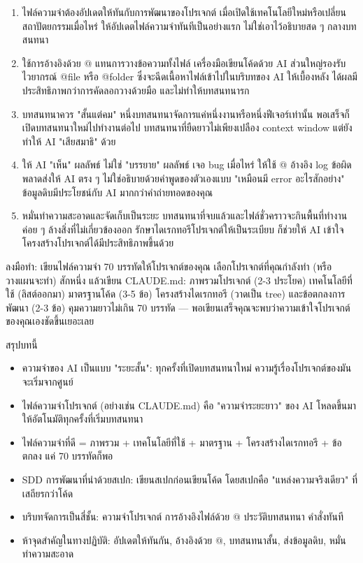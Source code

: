 \begin{enumerate}
  \item ไฟล์ความจำต้องอัปเดตให้ทันกับการพัฒนาของโปรเจกต์ เมื่อเปิดใช้เทคโนโลยีใหม่หรือเปลี่ยนสถาปัตยกรรมเมื่อไหร่ ให้อัปเดตไฟล์ความจำทันทีเป็นอย่างแรก ไม่ใช่เอาไว้อธิบายสด ๆ กลางบทสนทนา
  \item ใช้การอ้างอิงด้วย @ แทนการวางข้อความทั้งไฟล์ เครื่องมือเขียนโค้ดด้วย AI ส่วนใหญ่รองรับไวยากรณ์ @file หรือ @folder ซึ่งจะฉีดเนื้อหาไฟล์เข้าไปในบริบทของ AI ให้เบื้องหลัง ได้ผลมีประสิทธิภาพกว่าการคัดลอกวางด้วยมือ และไม่ทำให้บทสนทนารก
  \item บทสนทนาควร "สั้นแต่คม" หนึ่งบทสนทนาจัดการแค่หนึ่งงานหรือหนึ่งฟีเจอร์เท่านั้น พอเสร็จก็เปิดบทสนทนาใหม่ไปทำงานต่อไป บทสนทนาที่ยืดยาวไม่เพียงเปลือง context window แต่ยังทำให้ AI "เสียสมาธิ" ด้วย
  \item ให้ AI "เห็น" ผลลัพธ์ ไม่ใช่ "บรรยาย" ผลลัพธ์ เจอ bug เมื่อไหร่ ให้ใช้ @ อ้างอิง log ข้อผิดพลาดส่งให้ AI ตรง ๆ ไม่ใช่อธิบายด้วยคำพูดของตัวเองแบบ "เหมือนมี error อะไรสักอย่าง" ข้อมูลดิบมีประโยชน์กับ AI มากกว่าคำถ่ายทอดของคุณ
  \item หมั่นทำความสะอาดและจัดเก็บเป็นระยะ บทสนทนาที่จบแล้วและไฟล์ชั่วคราวจะกินพื้นที่ทำงาน ค่อย ๆ ล้างสิ่งที่ไม่เกี่ยวข้องออก รักษาไดเรกทอรีโปรเจกต์ให้เป็นระเบียบ ก็ช่วยให้ AI เข้าใจโครงสร้างโปรเจกต์ได้มีประสิทธิภาพขึ้นด้วย
\end{enumerate}

\begin{tcbpractice}{ลงมือทำ: เขียนไฟล์ความจำ 70 บรรทัดให้โปรเจกต์ของคุณ}
เลือกโปรเจกต์ที่คุณกำลังทำ (หรือวางแผนจะทำ) สักหนึ่ง แล้วเขียน CLAUDE.md: ภาพรวมโปรเจกต์ (2-3 ประโยค) เทคโนโลยีที่ใช้ (ลิสต์ออกมา) มาตรฐานโค้ด (3-5 ข้อ) โครงสร้างไดเรกทอรี (วาดเป็น tree) และข้อตกลงการพัฒนา (2-3 ข้อ) คุมความยาวไม่เกิน 70 บรรทัด — พอเขียนเสร็จคุณจะพบว่าความเข้าใจโปรเจกต์ของคุณเองชัดขึ้นเยอะเลย

\end{tcbpractice}

\begin{tcbsummary}{สรุปบทนี้}
\begin{itemize}
  \item ความจำของ AI เป็นแบบ "ระยะสั้น": ทุกครั้งที่เปิดบทสนทนาใหม่ ความรู้เรื่องโปรเจกต์ของมันจะเริ่มจากศูนย์
  \item ไฟล์ความจำโปรเจกต์ (อย่างเช่น CLAUDE.md) คือ "ความจำระยะยาว" ของ AI โหลดขึ้นมาให้อัตโนมัติทุกครั้งที่เริ่มบทสนทนา
  \item ไฟล์ความจำที่ดี = ภาพรวม + เทคโนโลยีที่ใช้ + มาตรฐาน + โครงสร้างไดเรกทอรี + ข้อตกลง แค่ 70 บรรทัดก็พอ
  \item SDD การพัฒนาที่นำด้วยสเปก: เขียนสเปกก่อนเขียนโค้ด โดยสเปกคือ "แหล่งความจริงเดียว" ที่เสถียรกว่าโค้ด
  \item บริบทจัดการเป็นสี่ชั้น: ความจำโปรเจกต์ การอ้างอิงไฟล์ด้วย @ ประวัติบทสนทนา คำสั่งทันที
  \item ห้าจุดสำคัญในทางปฏิบัติ: อัปเดตให้ทันกัน, อ้างอิงด้วย @, บทสนทนาสั้น, ส่งข้อมูลดิบ, หมั่นทำความสะอาด
\end{itemize}

\end{tcbsummary}
